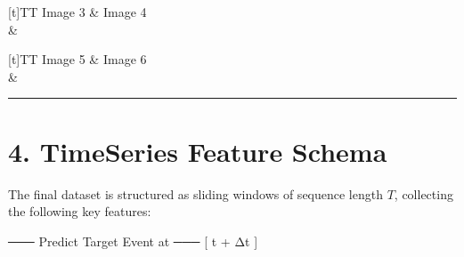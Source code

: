 \documentclass[letterpaper,10pt,english]{sphinxmanual}
\begin{document}
\begin{savenotes}\sphinxattablestart
\sphinxthistablewithglobalstyle
\centering
\begin{tabulary}{\linewidth}[t]{TT}
\sphinxtoprule
\sphinxstyletheadfamily 
\sphinxAtStartPar
Image 3
&\sphinxstyletheadfamily 
\sphinxAtStartPar
Image 4
\\
\sphinxmidrule
\sphinxtableatstartofbodyhook
\sphinxAtStartPar
{}
&
\sphinxAtStartPar
{}
\\
\sphinxbottomrule
\end{tabulary}
\sphinxtableafterendhook\par
\sphinxattableend\end{savenotes}


\begin{savenotes}\sphinxattablestart
\sphinxthistablewithglobalstyle
\centering
\begin{tabulary}{\linewidth}[t]{TT}
\sphinxtoprule
\sphinxstyletheadfamily 
\sphinxAtStartPar
Image 5
&\sphinxstyletheadfamily 
\sphinxAtStartPar
Image 6
\\
\sphinxmidrule
\sphinxtableatstartofbodyhook
\sphinxAtStartPar
{}
&
\sphinxAtStartPar
{}
\\
\sphinxbottomrule
\end{tabulary}
\sphinxtableafterendhook\par
\sphinxattableend\end{savenotes}


\bigskip\hrule\bigskip



\section{4. Time\sphinxhyphen{}Series Feature Schema}
\label{\detokenize{dataset:time-series-feature-schema}}
\sphinxAtStartPar
The final dataset is structured as sliding windows of sequence length \(T\), collecting the following key features:

\begin{sphinxVerbatim}  ───\PYGZgt{} Predict Target Event at ───\PYGZgt{} [ t + Δt ]
\end{sphinxVerbatim}
\end{document}
